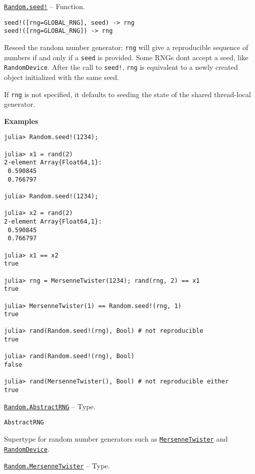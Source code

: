 \hypertarget{9373195541397142847}{} 
\hyperlink{9373195541397142847}{\texttt{Random.seed!}}  -- {Function.}

\begin{adjustwidth}{2em}{0pt}


\begin{verbatim}
seed!([rng=GLOBAL_RNG], seed) -> rng
seed!([rng=GLOBAL_RNG]) -> rng
\end{verbatim}

Reseed the random number generator: \texttt{rng} will give a reproducible sequence of numbers if and only if a \texttt{seed} is provided. Some RNGs don{\textquotesingle}t accept a seed, like \texttt{RandomDevice}. After the call to \texttt{seed!}, \texttt{rng} is equivalent to a newly created object initialized with the same seed.

If \texttt{rng} is not specified, it defaults to seeding the state of the shared thread-local generator.

\textbf{Examples}


\begin{verbatim}
julia> Random.seed!(1234);

julia> x1 = rand(2)
2-element Array{Float64,1}:
 0.590845
 0.766797

julia> Random.seed!(1234);

julia> x2 = rand(2)
2-element Array{Float64,1}:
 0.590845
 0.766797

julia> x1 == x2
true

julia> rng = MersenneTwister(1234); rand(rng, 2) == x1
true

julia> MersenneTwister(1) == Random.seed!(rng, 1)
true

julia> rand(Random.seed!(rng), Bool) # not reproducible
true

julia> rand(Random.seed!(rng), Bool)
false

julia> rand(MersenneTwister(), Bool) # not reproducible either
true
\end{verbatim}



\end{adjustwidth}
\hypertarget{17421972100838426566}{} 
\hyperlink{17421972100838426566}{\texttt{Random.AbstractRNG}}  -- {Type.}

\begin{adjustwidth}{2em}{0pt}


\begin{verbatim}
AbstractRNG
\end{verbatim}

Supertype for random number generators such as \hyperlink{4960058165975837552}{\texttt{MersenneTwister}} and \hyperlink{14367539717133476780}{\texttt{RandomDevice}}.



\end{adjustwidth}
\hypertarget{4960058165975837552}{} 
\hyperlink{4960058165975837552}{\texttt{Random.MersenneTwister}}  -- {Type.}

